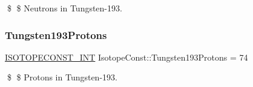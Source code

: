 \$ \$ Neutrons in Tungsten-\/193. \mbox{\label{group___isotope_const-_tungsten-_w193_gab760aff84a24eb8ddcc2ed2c1dfe23c0}} 
\subsubsection{\texorpdfstring{Tungsten193\+Protons}{Tungsten193Protons}}
{\footnotesize\ttfamily \mbox{\hyperlink{group___isotope_const-_macros_ga5f18360b3e99483a35c32d789e62621c}{I\+S\+O\+T\+O\+P\+E\+C\+O\+N\+S\+T\+\_\+\+I\+NT}} Isotope\+Const\+::\+Tungsten193\+Protons = 74}

\$ \$ Protons in Tungsten-\/193. 
